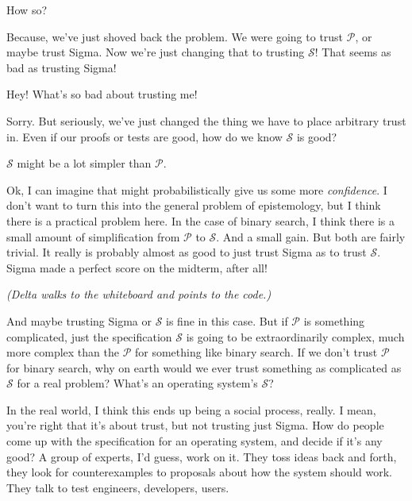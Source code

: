 \documentclass[sigplan]{acmart}
\begin{document}
 How so?

 Because, we've just shoved back the
problem.  We were going to trust $\mathcal{P}$, or maybe trust Sigma.
Now we're just changing that to trusting $\mathcal{S}$!  That seems as
bad as trusting Sigma!

 Hey!  What's so bad about trusting me!

 Sorry.  But seriously, we've just changed
the thing we have to place arbitrary trust in.  Even if our proofs or
tests are good, how do we know $\mathcal{S}$ is good?

 $\mathcal{S}$  might be a lot simpler than
$\mathcal{P}$.

 Ok, I can imagine that might
probabilistically give us some more \emph{confidence}.  I don't want
to turn this into the general problem of epistemology, but I think
there is a practical problem here.  In the case of binary search, I
think there is a small amount of simplification from 
$\mathcal{P}$ to $\mathcal{S}$.  And a small gain.  But both are
fairly trivial.  It really is probably almost as good to just trust
Sigma as to trust $\mathcal{S}$.  Sigma made a perfect score on the
midterm, after all!

\vspace{0.1in}

\emph{(Delta walks to the whiteboard and points to the code.)}

\vspace{0.1in}

  And maybe trusting Sigma or $\mathcal{S}$
is fine in this case.  But if $\mathcal{P}$ is something complicated,
just the specification $\mathcal{S}$ is going to be extraordinarily
complex, much more complex than the $\mathcal{P}$ for something like
binary search.  If we don't trust $\mathcal{P}$ for binary search, why
on earth would we ever trust something as complicated as $\mathcal{S}$
for a real problem?  What's an operating system's $\mathcal{S}$?

  In the real world, I think this ends up
being a social process, really.  I mean, you're right that it's about
trust, but not trusting just Sigma.  How do people come up with the
specification for an operating system, and decide if it's any good?  A
group of experts, I'd guess, work on it.  They toss ideas back and
forth, they look for counterexamples to proposals about how the system
should work.  They talk to test engineers, developers, users.
\end{document}
